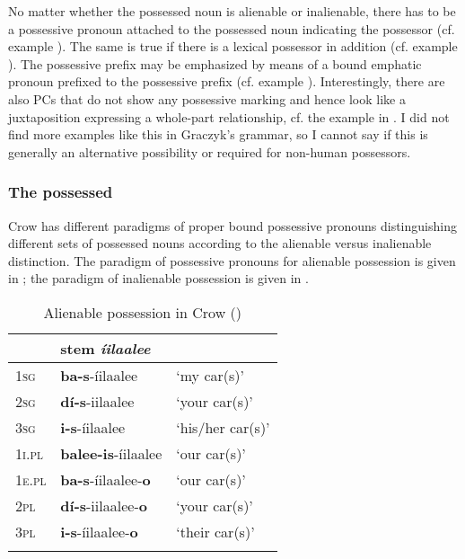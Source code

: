 \documentclass[output=paper]{LSP/langsci}
\begin{document}
No matter whether the possessed noun is alienable or inalienable, there has to be a possessive pronoun attached to the possessed noun indicating the possessor (cf. example ). The same is true if there is a lexical possessor in addition (cf. example ). The possessive prefix may be emphasized by means of a bound emphatic pronoun prefixed to the possessive prefix (cf. example ). Interestingly, there are also PCs that do not show any possessive marking and hence look like a juxtaposition expressing a whole-part relationship, cf. the example in . I did not find more examples like this in Graczyk's grammar, so I cannot say if this is generally an alternative possibility or required for non-human possessors.

\subsubsection{The possessed}
Crow has different paradigms of proper bound possessive pronouns distinguishing different sets of possessed nouns according to the alienable versus inalienable distinction. The paradigm of possessive pronouns for alienable possession is given in ; the paradigm of inalienable possession is given in .

\begin{table}
\caption{Alienable possession in Crow (\citealt[53]{Graczyk2007})} \label{crowalienablepossession}
\begin{tabular}{ l l l}
\lsptoprule
& stem \textit{íilaalee} & \\
\midrule 	
\textsc{1sg} & \textbf{ba-s}-íilaalee	& `my car(s)' \\
 
\textsc{2sg} & \textbf{dí-s}-iilaalee & `your car(s)' \\
 
\textsc{3sg} & \textbf{i-s}-íilaalee & `his/her car(s)' \\
 
\textsc{1i.pl} & \textbf{balee-is}-íilaalee & `our car(s)' \\
 
\textsc{1e.pl} & \textbf{ba-s}-íilaalee-\textbf{o} & `our car(s)' \\
 
\textsc{2pl} & \textbf{dí-s}-iilaalee-\textbf{o} & `your car(s)' \\
 
\textsc{3pl} & \textbf{i-s}-íilaalee-\textbf{o} & `their car(s)' \\
\lspbottomrule
\end{tabular}
\end{table}
\end{document}

